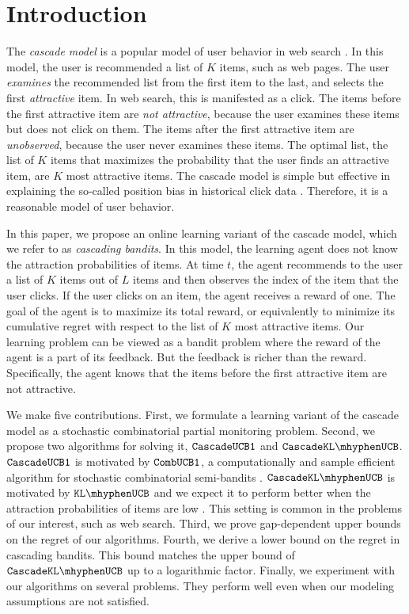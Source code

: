 
\section{Introduction}
\label{sec:introduction}

The \emph{cascade model} is a popular model of user behavior in web search \cite{craswell08experimental}. In this model, the user is recommended a list of $K$ items, such as web pages. The user \emph{examines} the recommended list from the first item to the last, and selects the first \emph{attractive} item. In web search, this is manifested as a click. The items before the first attractive item are \emph{not attractive}, because the user examines these items but does not click on them. The items after the first attractive item are \emph{unobserved}, because the user never examines these items. The optimal list, the list of $K$ items that maximizes the probability that the user finds an attractive item, are $K$ most attractive items. The cascade model is simple but effective in explaining the so-called position bias in historical click data \cite{craswell08experimental}. Therefore, it is a reasonable model of user behavior.

In this paper, we propose an online learning variant of the cascade model, which we refer to as \emph{cascading bandits}. In this model, the learning agent does not know the attraction probabilities of items. At time $t$, the agent recommends to the user a list of $K$ items out of $L$ items and then observes the index of the item that the user clicks. If the user clicks on an item, the agent receives a reward of one. The goal of the agent is to maximize its total reward, or equivalently to minimize its cumulative regret with respect to the list of $K$ most attractive items. Our learning problem can be viewed as a bandit problem where the reward of the agent is a part of its feedback. But the feedback is richer than the reward. Specifically, the agent knows that the items before the first attractive item are not attractive.

We make five contributions. First, we formulate a learning variant of the cascade model as a stochastic combinatorial partial monitoring problem. Second, we propose two algorithms for solving it, ${\tt CascadeUCB1}$ and $\cascadeklucb$. ${\tt CascadeUCB1}$ is motivated by ${\tt CombUCB1}$, a computationally and sample efficient algorithm for stochastic combinatorial semi-bandits \cite{gai12combinatorial,kveton15tight}. $\cascadeklucb$ is motivated by $\klucb$  and we expect it to perform better when the attraction probabilities of items are low \cite{garivier11klucb}. This setting is common in the problems of our interest, such as web search. Third, we prove gap-dependent upper bounds on the regret of our algorithms. Fourth, we derive a lower bound on the regret in cascading bandits. This bound matches the upper bound of $\cascadeklucb$ up to a logarithmic factor. Finally, we experiment with our algorithms on several problems. They perform well even when our modeling assumptions are not satisfied.

